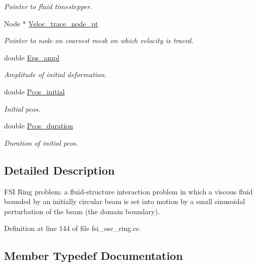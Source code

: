 \begin{DoxyCompactItemize}
\begin{DoxyCompactList}\small\item\em Pointer to fluid timestepper. \end{DoxyCompactList}\item 
Node $\ast$ \hyperlink{classFSIRingProblem_a2e64e4625ff61633607233d9a6205000}{Veloc\+\_\+trace\+\_\+node\+\_\+pt}
\begin{DoxyCompactList}\small\item\em Pointer to node on coarsest mesh on which velocity is traced. \end{DoxyCompactList}\item 
double \hyperlink{classFSIRingProblem_a6e14af107a8f5b5a5254a55f0707ff4c}{Eps\+\_\+ampl}
\begin{DoxyCompactList}\small\item\em Amplitude of initial deformation. \end{DoxyCompactList}\item 
double \hyperlink{classFSIRingProblem_a109eb6d9804264294357d6b76aa50ab6}{Pcos\+\_\+initial}
\begin{DoxyCompactList}\small\item\em Initial pcos. \end{DoxyCompactList}\item 
double \hyperlink{classFSIRingProblem_a90ff979880dbecb47f8830f4217eb17f}{Pcos\+\_\+duration}
\begin{DoxyCompactList}\small\item\em Duration of initial pcos. \end{DoxyCompactList}\end{DoxyCompactItemize}


\subsection{Detailed Description}
F\+SI Ring problem\+: a fluid-\/structure interaction problem in which a viscous fluid bounded by an initially circular beam is set into motion by a small sinusoidal perturbation of the beam (the domain boundary). 

Definition at line 144 of file fsi\+\_\+osc\+\_\+ring.\+cc.



\subsection{Member Typedef Documentation}
\mbox{\label{classFSIRingProblem_a2ce9ba3122272853bfa6ec3fcf39b78a}} 
